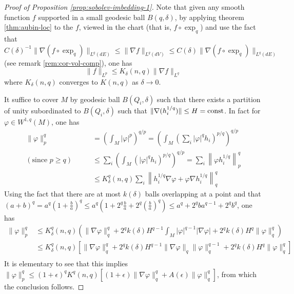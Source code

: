 \begin{proof}[Proof of Proposition \ref{prop:sobolev-imbedding-1}]
Note that given any smooth function \(f\) supported in a small geodesic ball \(B(q,\delta)\),
by applying theorem \ref{thm:aubin-loc} to the \(f\), viewed in the chart (that is,
\(f\circ \exp_q\)) and use the fact that \(C(\delta)^{-1} \|\nabla (f\circ\exp_q)\|_{L^q(dE)} \leq \|\nabla f\|_{L^q(dV)} \leq C(\delta)
\|\nabla (f\circ\exp_q)\|_{L^q(dE)}\) (see remark \ref{rem:cor-vol-comp}), one has
\[
\|f\|_{L^p} \leq K_\delta(n,q) \|\nabla f \|_{L^q}
\]
where \(K_\delta(n,q)\) converges to \(K(n,q)\) as \(\delta\to 0\).


It suffice to cover \(M\) by geodesic ball \(B(Q_i,\delta)\) such that there exists a
partition of unity subordinated to \(B(Q_i,\delta)\) such that
\(\|\nabla (h_i^{1/q})\| \leq H=\mathop{\rm const }\nolimits\). In fact for \(\varphi \in W^{1,q}(M)\), one has
\begin{equation*}
\begin{split}
\|\varphi\|_p^q &= \left(\int_M |\varphi|^p\right)^{q/p}=\left(\int_M \left(\sum_i |\varphi|^q h_i\right)^{p/q} \right)^{q/p}\\
(\text{since } p\geq q)\qquad		&\leq \sum_i\left(\int_M \left(|\varphi|^q h_i\right)^{p/q} \right)^{q/p} = \sum_i \left\| \varphi h_i^{1/q} \right\|_p^q\\
	       	     			&\leq K^q_\delta(n,q) \sum_i \left\| h_i^{1/q}\nabla\varphi + \varphi\nabla h_i^{1/q}\right\|_q^q
\end{split}   
\end{equation*}
Using the fact that there are at most \(k(\delta)\) balls overlapping at a point and that \((a+b)^q = a^q \left(1+ \frac{b}{a}\right)^q \leq a^q(1 + 2^q \frac{b}{a} +
2^q (\frac{b}{a})^{q})\leq a^q + 2^q ba^{q-1} + 2^{q}b^q\), one has
\begin{equation*}
\begin{split}
\|\varphi\|_{p}^q &\leq K^q_\delta(n,q)\left(\|\nabla\varphi\|_q^q + 2^q k(\delta) H^{q-1}\int_M |\varphi|^{q-1}|\nabla\varphi| + 2^q k(\delta) H^q \| \varphi\|_q^q \right) \\
		  &\leq K^q_\delta(n,q)\left[\|\nabla\varphi\|_q^q + 2^q k(\delta) H^{q-1}\|\nabla\varphi\|_q\|\varphi\|_q^{q-1}  + 2^q k(\delta) H^q \| \varphi\|_q^q \right]\\
\end{split}   
\end{equation*}
It is elementary to see that this implies
\(\|\varphi\|_{p}^q \leq (1+\epsilon)^qK^q(n,q)\left[(1+\epsilon)\|\nabla\varphi\|_q^q +
A(\epsilon) \| \varphi\|_q^q \right]\), from which the conclusion follows.  


\end{proof}
